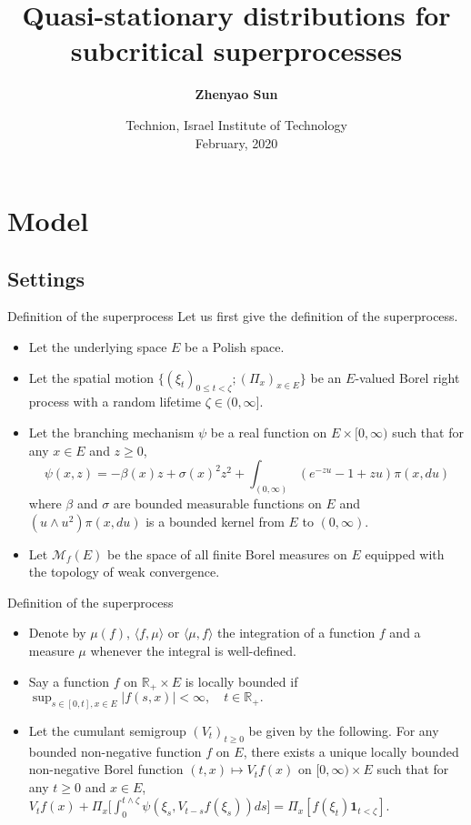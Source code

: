 \documentclass[xcolor=dvipsnames]{beamer}
\title[QSDs for superprocesses]{Quasi-stationary distributions for subcritical superprocesses}
\author[Zhenyao Sun]{ 
  {\bf \Large Zhenyao Sun  }
}
\institute[]{
	Based on a joint work with {\bf Rongli Liu}, {\bf Yan-Xia Ren} and {\bf Renming Song}}
\date[]{
	Technion, Israel Institute of Technology
\\ February, 2020}
\begin{document}
\begin{frame}
  \titlepage
\end{frame}

\section{Model}
\subsection{Settings}
\begin{frame}{Definition of the superprocess}
	Let us first give the definition of the superprocess.
\begin{itemize}
\item
	Let the {\color{red} underlying space} $E$ be a Polish space. 
\item
	Let the {\color{red} spatial motion} $\{(\xi_t)_{0\leq t< \zeta}; (\Pi_x)_{x\in E}\}$ be an $E$-valued Borel right process with a random lifetime $\zeta \in (0,\infty]$. 
\item
	Let the {\color{red} branching mechanism} $\psi$ be a real function on $E\times [0,\infty)$ such that for any $x\in E$ and $z\geq 0$,
  \[\psi(x, z)=
  - \beta(x) z + \sigma(x)^2 z^2 + \int_{(0,\infty)} (e^{-zu} - 1 + zu) \pi(x,du)
  \]
	where $\beta$ and $\sigma$ are bounded measurable functions on $E$ and $(u\wedge u^2)\pi(x,du)$ is a bounded kernel from $E$ to $(0,\infty)$.

\item
	Let $\mathcal M_f(E)$ be the space of all finite Borel measures on $E$ equipped with the topology of weak convergence.
\end{itemize}
\end{frame}

\begin{frame}{Definition of the superprocess}
\begin{itemize}
\item
  Denote by $\mu(f)$, $\langle f, \mu\rangle$ or $\langle \mu, f\rangle$ the integration of a function $f$ and a measure $\mu$ whenever the integral is well-defined.
\item
	Say a function $f$ on $\mathbb R_+\times E$ is {\color{red} locally bounded} if 
$
    \sup_{s\in [0,t],x\in E} |f(s,x)|
    <\infty,
    \quad t\in \mathbb R_+.
$
\item 
	Let the {\color{red} cumulant semigroup} $(V_t)_{t\geq 0}$ be given by the following. 
	For any bounded non-negative function $f$ on $E$, there exists a unique locally bounded non-negative Borel function $(t,x) \mapsto V_tf(x)$ on $[0,\infty) \times E$ such that for any $t\geq 0$ and $x\in E$,
$
	V_tf(x) + \Pi_x \Big[ \int_0^{t\wedge \zeta} \psi(\xi_s, V_{t-s}f (\xi_s)) ds\Big] = \Pi_x[f(\xi_t) \mathbf 1_{t< \zeta}].
$
\end{itemize}
\end{frame}
\end{document}

